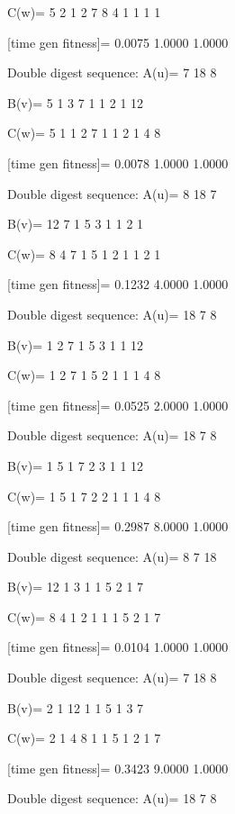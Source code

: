 C(w)=
     5     2     1     2     7     8     4     1     1     1     1

[time gen fitness]=
    0.0075    1.0000    1.0000

Double digest sequence:
A(u)=
     7    18     8

B(v)=
     5     1     3     7     1     1     2     1    12

C(w)=
     5     1     1     2     7     1     1     2     1     4     8

[time gen fitness]=
    0.0078    1.0000    1.0000

Double digest sequence:
A(u)=
     8    18     7

B(v)=
    12     7     1     5     3     1     1     2     1

C(w)=
     8     4     7     1     5     1     2     1     1     2     1

[time gen fitness]=
    0.1232    4.0000    1.0000

Double digest sequence:
A(u)=
    18     7     8

B(v)=
     1     2     7     1     5     3     1     1    12

C(w)=
     1     2     7     1     5     2     1     1     1     4     8

[time gen fitness]=
    0.0525    2.0000    1.0000

Double digest sequence:
A(u)=
    18     7     8

B(v)=
     1     5     1     7     2     3     1     1    12

C(w)=
     1     5     1     7     2     2     1     1     1     4     8

[time gen fitness]=
    0.2987    8.0000    1.0000

Double digest sequence:
A(u)=
     8     7    18

B(v)=
    12     1     3     1     1     5     2     1     7

C(w)=
     8     4     1     2     1     1     1     5     2     1     7

[time gen fitness]=
    0.0104    1.0000    1.0000

Double digest sequence:
A(u)=
     7    18     8

B(v)=
     2     1    12     1     1     5     1     3     7

C(w)=
     2     1     4     8     1     1     5     1     2     1     7

[time gen fitness]=
    0.3423    9.0000    1.0000

Double digest sequence:
A(u)=
    18     7     8

